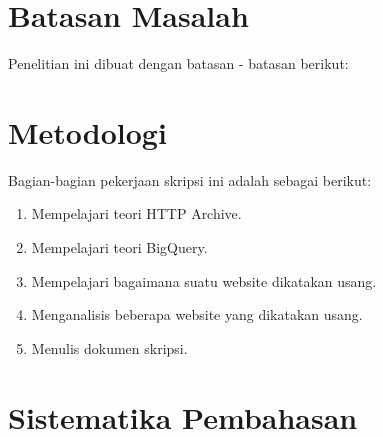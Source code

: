 \section{Batasan Masalah}
\label{sec:batasan}
Penelitian ini dibuat dengan batasan - batasan berikut:


\section{Metodologi}
\label{sec:metlit}
Bagian-bagian pekerjaan skripsi ini adalah sebagai berikut:
\begin{enumerate}
	\item Mempelajari teori HTTP Archive.
	\item Mempelajari teori BigQuery.
	\item Mempelajari bagaimana suatu website dikatakan usang.
	\item Menganalisis beberapa website yang dikatakan usang.
	\item Menulis dokumen skripsi.
\end{enumerate}


\section{Sistematika Pembahasan}
\label{sec:sispem}
